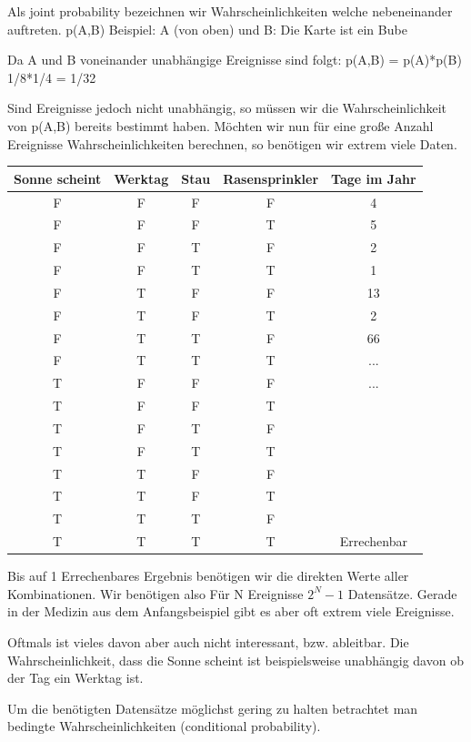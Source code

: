 Als joint probability bezeichnen wir Wahrscheinlichkeiten welche nebeneinander auftreten. p(A,B)
Beispiel: A (von oben) und B: Die Karte ist ein Bube

Da A und B voneinander unabhängige Ereignisse sind folgt:
p(A,B) = p(A)*p(B) 1/8*1/4 = 1/32

Sind Ereignisse jedoch nicht unabhängig, so müssen wir die Wahrscheinlichkeit von p(A,B) bereits bestimmt haben.
Möchten wir nun für eine große Anzahl Ereignisse Wahrscheinlichkeiten berechnen, so benötigen wir extrem viele Daten.

\begin{center}
\begin{tabular}{ ccccc } \toprule
Sonne scheint & Werktag & Stau & Rasensprinkler & Tage im Jahr \\ \midrule
F & F & F & F & 4 \\
F & F & F & T & 5 \\
F & F & T & F & 2 \\
F & F & T & T & 1 \\
F & T & F & F & 13 \\
F & T & F & T & 2 \\
F & T & T & F & 66 \\
F & T & T & T & ... \\
T & F & F & F & ... \\
T & F & F & T & \\
T & F & T & F & \\
T & F & T & T & \\
T & T & F & F & \\
T & T & F & T & \\
T & T & T & F & \\
T & T & T & T & Errechenbar \\
\bottomrule
\end{tabular}
\end{center}


Bis auf 1 Errechenbares Ergebnis benötigen wir die direkten Werte aller Kombinationen.
Wir benötigen also Für N Ereignisse $2^N-1$ Datensätze.
Gerade in der Medizin aus dem Anfangsbeispiel gibt es aber oft extrem viele Ereignisse.

Oftmals ist vieles davon aber auch nicht interessant, bzw. ableitbar.
Die Wahrscheinlichkeit, dass die Sonne scheint ist beispielsweise unabhängig davon ob der Tag ein Werktag ist.

Um die benötigten Datensätze möglichst gering zu halten betrachtet man bedingte Wahrscheinlichkeiten (conditional probability).

